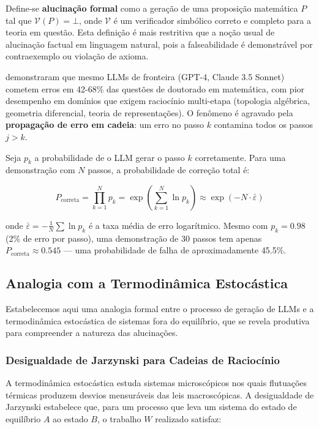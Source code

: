 \documentclass[5p]{elsarticle}
\theoremstyle{remark}
\begin{document}
Define-se \textbf{alucinação formal} como a geração de uma proposição matemática $P$ tal que $\mathcal{V}(P) = \bot$, onde $\mathcal{V}$ é um verificador simbólico correto e completo para a teoria em questão. Esta definição é mais restritiva que a noção usual de alucinação factual em linguagem natural, pois a falseabilidade é demonstrável por contraexemplo ou violação de axioma.

\cite{Frieder2024Mathematical} demonstraram que mesmo LLMs de fronteira (GPT-4, Claude 3.5 Sonnet) cometem erros em 42-68\% das questões de doutorado em matemática, com pior desempenho em domínios que exigem raciocínio multi-etapa (topologia algébrica, geometria diferencial, teoria de representações). O fenômeno é agravado pela \textbf{propagação de erro em cadeia}: um erro no passo $k$ contamina todos os passos $j > k$.

Seja $p_k$ a probabilidade de o LLM gerar o passo $k$ corretamente. Para uma demonstração com $N$ passos, a probabilidade de correção total é:

\begin{equation}
P_{\text{correta}} = \prod_{k=1}^{N} p_k = \exp\left(\sum_{k=1}^{N} \ln p_k\right) \approx \exp\left(-N \cdot \bar{\varepsilon}\right)
\label{eq:prob_decay}
\end{equation}

onde $\bar{\varepsilon} = -\frac{1}{N}\sum \ln p_k$ é a taxa média de erro logarítmico. Mesmo com $p_k = 0.98$ (2\% de erro por passo), uma demonstração de 30 passos tem apenas $P_{\text{correta}} \approx 0.545$ --- uma probabilidade de falha de aproximadamente 45.5\%.

\subsection{Analogia com a Termodinâmica Estocástica}

Estabelecemos aqui uma analogia formal entre o processo de geração de LLMs e a termodinâmica estocástica de sistemas fora do equilíbrio, que se revela produtiva para compreender a natureza das alucinações.

\subsubsection{Desigualdade de Jarzynski para Cadeias de Raciocínio}

A termodinâmica estocástica \cite{Seifert2012Stochastic, Jarzynski1997Equality} estuda sistemas microscópicos nos quais flutuações térmicas produzem desvios mensuráveis das leis macroscópicas. A desigualdade de Jarzynski \cite{Jarzynski1997Equality} estabelece que, para um processo que leva um sistema do estado de equilíbrio $A$ ao estado $B$, o trabalho $W$ realizado satisfaz:
\end{document}
